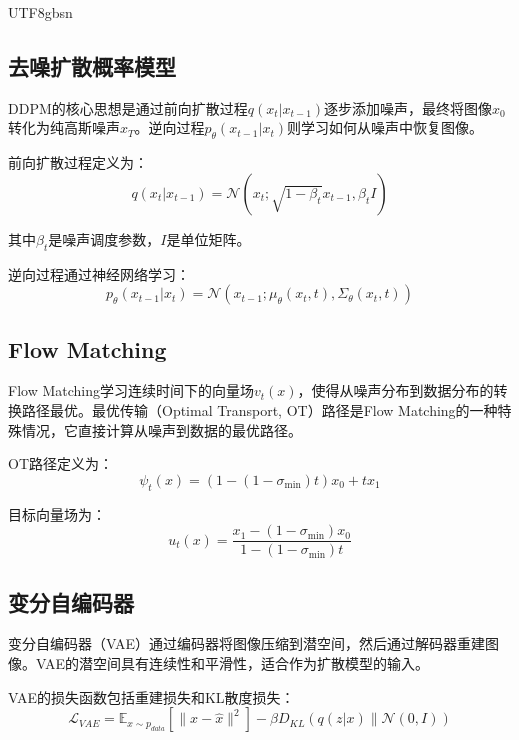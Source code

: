 \documentclass[11pt,a4paper]{article}
\begin{document}
\begin{CJK*}{UTF8}{gbsn}
\subsection{去噪扩散概率模型}

DDPM的核心思想是通过前向扩散过程$q(x_t|x_{t-1})$逐步添加噪声，最终将图像$x_0$转化为纯高斯噪声$x_T$。逆向过程$p_\theta(x_{t-1}|x_t)$则学习如何从噪声中恢复图像。

前向扩散过程定义为：
\begin{equation}
q(x_t|x_{t-1}) = \mathcal{N}(x_t; \sqrt{1-\beta_t}x_{t-1}, \beta_t I)
\end{equation}

其中$\beta_t$是噪声调度参数，$I$是单位矩阵。

逆向过程通过神经网络学习：
\begin{equation}
p_\theta(x_{t-1}|x_t) = \mathcal{N}(x_{t-1}; \mu_\theta(x_t, t), \Sigma_\theta(x_t, t))
\end{equation}

\subsection{Flow Matching}

Flow Matching学习连续时间下的向量场$v_t(x)$，使得从噪声分布到数据分布的转换路径最优。最优传输（Optimal Transport, OT）路径是Flow Matching的一种特殊情况，它直接计算从噪声到数据的最优路径。

OT路径定义为：
\begin{equation}
\psi_t(x) = (1-(1-\sigma_{\min})t)x_0 + tx_1
\end{equation}

目标向量场为：
\begin{equation}
u_t(x) = \frac{x_1 - (1-\sigma_{\min})x_0}{1-(1-\sigma_{\min})t}
\end{equation}

\subsection{变分自编码器}

变分自编码器（VAE）\cite{kingma2013auto}通过编码器将图像压缩到潜空间，然后通过解码器重建图像。VAE的潜空间具有连续性和平滑性，适合作为扩散模型的输入。

VAE的损失函数包括重建损失和KL散度损失：
\begin{equation}
\mathcal{L}_{VAE} = \mathbb{E}_{x\sim p_{data}}[\|x - \hat{x}\|^2] - \beta D_{KL}(q(z|x) \| \mathcal{N}(0, I))
\end{equation}


\end{CJK*}
\end{document}
